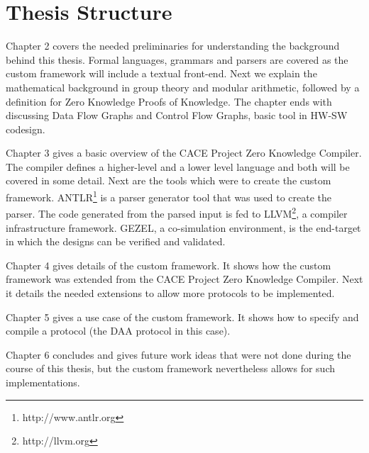 \section{Thesis Structure}

Chapter 2 covers the needed preliminaries for understanding the
background behind this thesis. Formal languages, grammars and parsers
are covered as the custom framework will include a textual front-end.
Next we explain the mathematical background in group theory and modular
arithmetic, followed by a definition for Zero Knowledge Proofs of
Knowledge. The chapter ends with discussing Data Flow Graphs and
Control Flow Graphs, basic tool in HW-SW codesign.

Chapter 3 gives a basic overview of the CACE Project Zero Knowledge
Compiler. The compiler defines a higher-level and a lower level
language and both will be covered in some detail. Next are the tools
which were to create the custom framework.
ANTLR\footnote{http://www.antlr.org} is a parser generator tool that
was used to create the parser. The code generated from the parsed
input is fed to LLVM\footnote{http://llvm.org}, a compiler
infrastructure framework. GEZEL, a co-simulation environment, is the
end-target in which the designs can be verified and validated.

Chapter 4 gives details of the custom framework. It shows how the
custom framework was extended from the CACE Project Zero Knowledge
Compiler. Next it details the needed extensions to allow more protocols
to be implemented.

Chapter 5 gives a use case of the custom framework. It shows how to
specify and compile a protocol (the DAA protocol in this case).

Chapter 6 concludes and gives future work ideas that were not done
during the course of this thesis, but the custom framework
nevertheless allows for such implementations.

